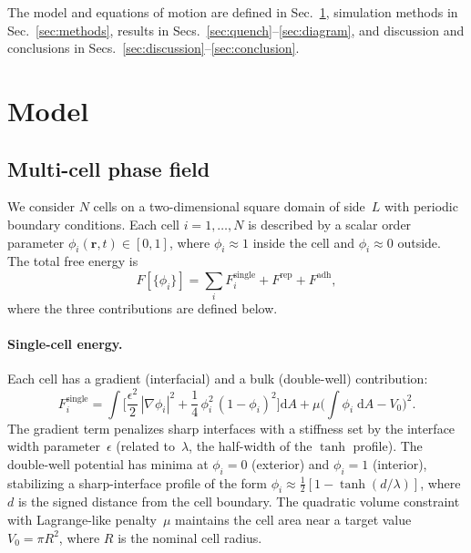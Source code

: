 \documentclass[aps,pre,twocolumn,superscriptaddress,longbibliography]{revtex4-2}
\newcommand{\dd}{\mathrm{d}}               %
\newcommand{\phii}{\phi_i}                 %
\begin{document}
The model and equations of motion are defined in Sec.~\ref{sec:model},
simulation methods in Sec.~\ref{sec:methods}, results in
Secs.~\ref{sec:quench}--\ref{sec:diagram}, and discussion and conclusions
in Secs.~\ref{sec:discussion}--\ref{sec:conclusion}.


\section{Model}
\label{sec:model}

\subsection{Multi-cell phase field}
\label{sec:model:pf}

We consider $N$ cells on a two-dimensional square domain of side~$L$ with
periodic boundary conditions.  Each cell $i = 1,\dots,N$ is described by a
scalar order parameter $\phii(\bm{r},t) \in [0,1]$, where $\phii \approx 1$
inside the cell and $\phii \approx 0$ outside.  The total free energy is
%
\begin{equation}
  F[\{\phii\}] = \sum_i F_i^{\mathrm{single}}
                 + F^{\mathrm{rep}}
                 + F^{\mathrm{adh}},
  \label{eq:total-energy}
\end{equation}
%
where the three contributions are defined below.

\paragraph{Single-cell energy.}
Each cell has a gradient (interfacial) and a bulk (double-well) contribution:
%
\begin{equation}
  F_i^{\mathrm{single}}
    = \int \!\biggl[
        \frac{\epsilon^2}{2}\,|\nabla\phii|^2
        + \frac{1}{4}\,\phii^2\,(1 - \phii)^2
      \biggr]\dd A
    + \mu\biggl(\int\!\phii\;\dd A - V_0\biggr)^{\!2}.
  \label{eq:single-cell}
\end{equation}
%
The gradient term penalizes sharp interfaces with a stiffness set by the
interface width parameter~$\epsilon$ (related to~$\lambda$, the half-width of
the $\tanh$ profile).  The double-well potential has minima at $\phii = 0$
(exterior) and $\phii = 1$ (interior), stabilizing a sharp-interface profile
of the form $\phii \approx \tfrac{1}{2}[1 - \tanh(d/\lambda)]$, where $d$ is
the signed distance from the cell boundary.  The quadratic volume constraint
with Lagrange-like penalty~$\mu$ maintains the cell area near a target
value~$V_0 = \pi R^2$, where $R$ is the nominal cell radius.
\end{document}
